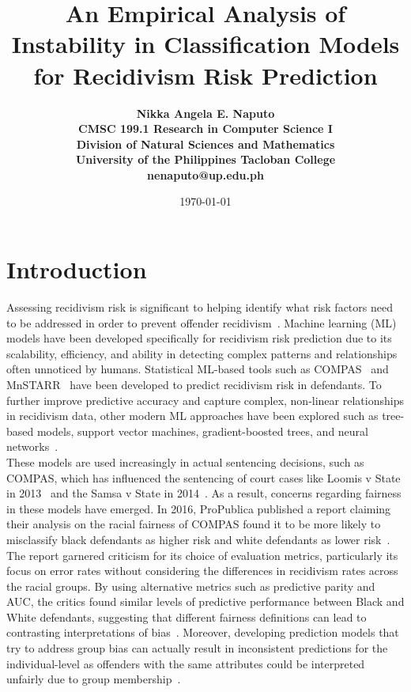 \documentclass[12pt]{article}
\title{\bfseries An Empirical Analysis of Instability in Classification Models for Recidivism Risk Prediction}
\author{\bfseries 
 Nikka Angela E. Naputo\\
 CMSC 199.1 Research in Computer Science I\\
 Division of Natural Sciences and Mathematics\\
 University of the Philippines Tacloban College\\
 {\small nenaputo@up.edu.ph}
}
\date{\today}
\begin{document}
\sloppy %

\maketitle 
\newpage 

\tableofcontents 
\newpage

\section{Introduction} 
\tab Assessing recidivism risk is significant to helping identify what risk factors need to be addressed in order to prevent offender recidivism~\cite{bonta2007risk, duwe2017out}. Machine learning (ML) models have been developed specifically for recidivism risk prediction due to its scalability, efficiency, and ability in detecting complex patterns and relationships often unnoticed by humans. Statistical ML-based tools such as COMPAS~\cite{northpointe2015practitioner} and MnSTARR~\cite{duwe2014development} have been developed to predict recidivism risk in defendants. To further improve predictive accuracy and capture complex, non-linear relationships in recidivism data, other modern ML approaches have been explored such as tree-based models, support vector machines, gradient-boosted trees, and neural networks~\cite{duwe2017out}.\\

These models are used increasingly in actual sentencing decisions, such as COMPAS, which has influenced the sentencing of court cases like Loomis v State in 2013~\cite{loomis2016} and the Samsa v State in 2014~\cite{samsa2014}. As a result, concerns regarding fairness in these models have emerged. In 2016, ProPublica published a report claiming their analysis on the racial fairness of COMPAS found it to be more likely to misclassify black defendants as higher risk and white defendants as lower risk~\cite{propublica2016analysis}. The report garnered criticism for its choice of evaluation metrics, particularly its focus on error rates without considering the differences in recidivism rates across the racial groups. By using alternative metrics such as predictive parity and AUC, the critics found similar levels of predictive performance between Black and White defendants, suggesting that different fairness definitions can lead to contrasting interpretations of bias~\cite{dieterich2016compas, corbett2017algorithmic, flores2016false}. Moreover, developing prediction models that try to address group bias can actually result in inconsistent predictions for the individual-level as offenders with the same attributes could be interpreted unfairly due to group membership~\cite{greene2022forks, corbett2017algorithmic}. \\
\end{document}
